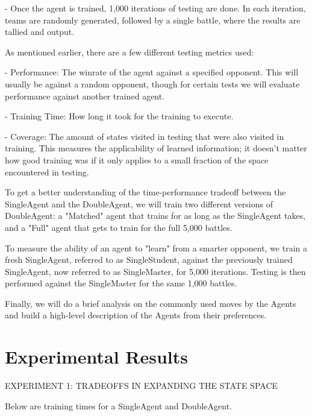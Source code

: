 \documentclass{article}
\begin{document}
\quad\quad - Once the agent is trained, 1,000 iterations of testing are done. In each iteration, teams are randomly generated, followed by a single battle, where the results are tallied and output.

\quad As mentioned earlier, there are a few different testing metrics used:

\quad\quad - Performance: The winrate of the agent against a specified opponent. This will usually be against a random opponent, though for certain tests we will evaluate performance against another trained agent.

\quad\quad - Training Time: How long it took for the training to execute.

\quad\quad - Coverage: The amount of states visited in testing that were also visited in training. This measures the applicability of learned information; it doesn't matter how good training was if it only applies to a small fraction of the space encountered in testing.

\quad\quad To get a better understanding of the time-performance tradeoff between the SingleAgent and the DoubleAgent, we will train two different versions of DoubleAgent: a "Matched" agent that trains for as long as the SingleAgent takes, and a "Full" agent that gets to train for the full 5,000 battles. 

\quad To measure the ability of an agent to "learn" from a smarter opponent, we train a fresh SingleAgent, referred to as SingleStudent, against the previously trained SingleAgent, now referred to as SingleMaster, for 5,000 iterations. Testing is then performed against the SingleMaster for the same 1,000 battles. 

\quad Finally, we will do a brief analysis on the commonly used moves by the Agents and build a high-level description of the Agents from their preferences.


\section{Experimental Results}
\label{sec:result}
	
\quad EXPERIMENT 1: TRADEOFFS IN EXPANDING THE STATE SPACE

\quad	Below are training times for a SingleAgent and DoubleAgent.
\end{document}
